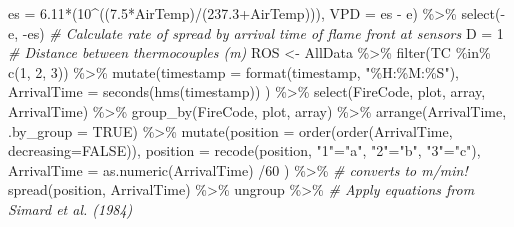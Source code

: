 \documentclass[
]{article}
\newenvironment{Shaded}{\begin{snugshade}}{\end{snugshade}}
\newcommand{\AttributeTok}[1]{\textcolor[rgb]{0.77,0.63,0.00}{#1}}
\newcommand{\CommentTok}[1]{\textcolor[rgb]{0.56,0.35,0.01}{\textit{#1}}}
\newcommand{\ConstantTok}[1]{\textcolor[rgb]{0.00,0.00,0.00}{#1}}
\newcommand{\DecValTok}[1]{\textcolor[rgb]{0.00,0.00,0.81}{#1}}
\newcommand{\FloatTok}[1]{\textcolor[rgb]{0.00,0.00,0.81}{#1}}
\newcommand{\FunctionTok}[1]{\textcolor[rgb]{0.00,0.00,0.00}{#1}}
\newcommand{\NormalTok}[1]{#1}
\newcommand{\OtherTok}[1]{\textcolor[rgb]{0.56,0.35,0.01}{#1}}
\newcommand{\SpecialCharTok}[1]{\textcolor[rgb]{0.00,0.00,0.00}{#1}}
\newcommand{\StringTok}[1]{\textcolor[rgb]{0.31,0.60,0.02}{#1}}
\begin{document}
\begin{Shaded}
\begin{Highlighting}[]
             \AttributeTok{es =} \FloatTok{6.11}\SpecialCharTok{*}\NormalTok{(}\DecValTok{10}\SpecialCharTok{\^{}}\NormalTok{((}\FloatTok{7.5}\SpecialCharTok{*}\NormalTok{AirTemp)}\SpecialCharTok{/}\NormalTok{(}\FloatTok{237.3}\SpecialCharTok{+}\NormalTok{AirTemp))), }
             \AttributeTok{VPD =}\NormalTok{ es }\SpecialCharTok{{-}}\NormalTok{ e) }\SpecialCharTok{\%\textgreater{}\%}
      \FunctionTok{select}\NormalTok{(}\SpecialCharTok{{-}}\NormalTok{e, }\SpecialCharTok{{-}}\NormalTok{es)}
\CommentTok{\# Calculate rate of spread by arrival time of flame front at sensors }
\NormalTok{  D }\OtherTok{=} \DecValTok{1}   \CommentTok{\# Distance between thermocouples (m)}
\NormalTok{  ROS }\OtherTok{\textless{}{-}} 
\NormalTok{    AllData }\SpecialCharTok{\%\textgreater{}\%}
      \FunctionTok{filter}\NormalTok{(TC }\SpecialCharTok{\%in\%} \FunctionTok{c}\NormalTok{(}\StringTok{\textquotesingle{}1\textquotesingle{}}\NormalTok{, }\StringTok{\textquotesingle{}2\textquotesingle{}}\NormalTok{, }\StringTok{\textquotesingle{}3\textquotesingle{}}\NormalTok{)) }\SpecialCharTok{\%\textgreater{}\%}
      \FunctionTok{mutate}\NormalTok{(}\AttributeTok{timestamp =} \FunctionTok{format}\NormalTok{(timestamp, }\StringTok{"\%H:\%M:\%S"}\NormalTok{), }
             \AttributeTok{ArrivalTime =} \FunctionTok{seconds}\NormalTok{(}\FunctionTok{hms}\NormalTok{(timestamp)) ) }\SpecialCharTok{\%\textgreater{}\%}
    \FunctionTok{select}\NormalTok{(FireCode, plot, array, ArrivalTime) }\SpecialCharTok{\%\textgreater{}\%}
    \FunctionTok{group\_by}\NormalTok{(FireCode, plot, array) }\SpecialCharTok{\%\textgreater{}\%}
    \FunctionTok{arrange}\NormalTok{(ArrivalTime, }\AttributeTok{.by\_group =} \ConstantTok{TRUE}\NormalTok{) }\SpecialCharTok{\%\textgreater{}\%} 
    \FunctionTok{mutate}\NormalTok{(}\AttributeTok{position =} \FunctionTok{order}\NormalTok{(}\FunctionTok{order}\NormalTok{(ArrivalTime, }\AttributeTok{decreasing=}\ConstantTok{FALSE}\NormalTok{)), }
           \AttributeTok{position =} \FunctionTok{recode}\NormalTok{(position, }\StringTok{"1"}\OtherTok{=}\StringTok{"a"}\NormalTok{, }\StringTok{"2"}\OtherTok{=}\StringTok{"b"}\NormalTok{, }\StringTok{"3"}\OtherTok{=}\StringTok{"c"}\NormalTok{), }
           \AttributeTok{ArrivalTime =} \FunctionTok{as.numeric}\NormalTok{(ArrivalTime) }\SpecialCharTok{/}\DecValTok{60}\NormalTok{ ) }\SpecialCharTok{\%\textgreater{}\%} \CommentTok{\# converts to m/min!}
    \FunctionTok{spread}\NormalTok{(position, ArrivalTime)  }\SpecialCharTok{\%\textgreater{}\%}
\NormalTok{    ungroup }\SpecialCharTok{\%\textgreater{}\%} 
    \CommentTok{\# Apply equations from Simard et al. (1984)}

\end{Highlighting}
\end{Shaded}
\end{document}
